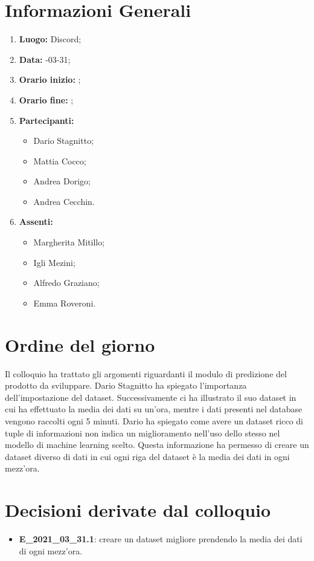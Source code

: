 \newpage
\section{Informazioni Generali}
\begin{enumerate}
	\item \textbf{Luogo:} \normalfont Discord;
	\item \textbf{Data:} -03-31;
	\item \textbf{Orario inizio:} ;
	\item \textbf{Orario fine:} ;
	\item \textbf{Partecipanti:}
	\begin{itemize}
		\item Dario Stagnitto;
		\item Mattia Cocco;
		\item Andrea Dorigo;
		\item Andrea Cecchin.
	\end{itemize}
	\item \textbf{Assenti:}
	\begin{itemize}
		\item Margherita Mitillo;
		\item Igli Mezini;
		\item Alfredo Graziano;
		\item Emma Roveroni.
	\end{itemize}
\end{enumerate}
\section{Ordine del giorno}
Il colloquio ha trattato gli argomenti riguardanti il modulo di predizione del prodotto da sviluppare. Dario Stagnitto ha spiegato l'importanza dell'impostazione del dataset. Successivamente ci ha illustrato il suo dataset in cui ha effettuato la media dei dati su un'ora, mentre i dati presenti nel database vengono raccolti ogni 5 minuti. Dario ha spiegato come avere un dataset ricco di tuple di informazioni non indica un miglioramento nell'uso dello stesso nel modello di machine learning scelto. Questa informazione ha permesso di creare un dataset diverso di dati in cui ogni riga del dataset è la media dei dati in ogni mezz'ora.
\section{Decisioni derivate dal colloquio}
\begin{itemize}
	\item \textbf{E\_2021\_03\_31.1}: creare un dataset migliore prendendo la media dei dati di ogni mezz'ora.
\end{itemize}
